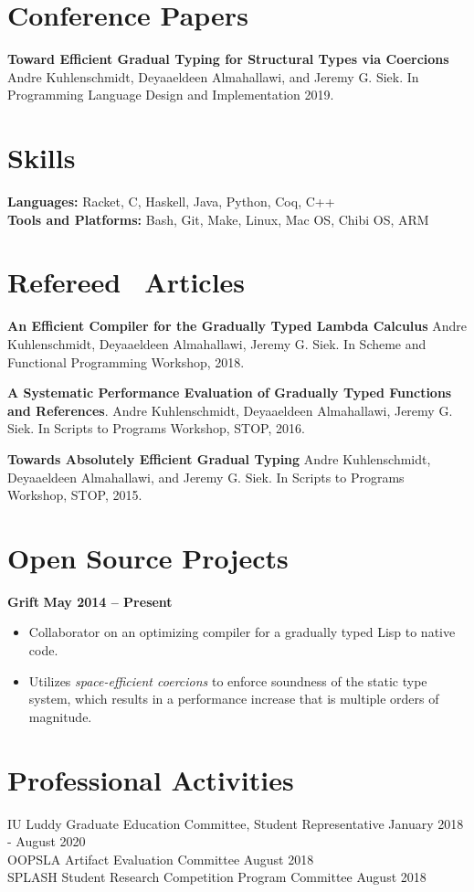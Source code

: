 \documentclass[resmargin,line]{res}
\begin{document}
\begin{resume}
\section{\sc Conference Papers}
{\bf Toward Efficient Gradual Typing for Structural Types via Coercions}
Andre Kuhlenschmidt, Deyaaeldeen Almahallawi, and Jeremy G. Siek.
In Programming Language Design and Implementation 2019.

\section{\sc Skills}
{\bf Languages:} Racket, C, Haskell, Java, Python, Coq, C++\\
{\bf Tools and Platforms:} Bash, Git, Make, Linux, Mac OS, Chibi OS, ARM

\section{\sc Refereed \, Articles}

{\bf An Efficient Compiler for the Gradually Typed Lambda Calculus}
Andre Kuhlenschmidt, Deyaaeldeen Almahallawi, Jeremy G. Siek.
In Scheme and Functional Programming Workshop, 2018.

{\bf A Systematic Performance Evaluation of Gradually Typed Functions
  and References}.
Andre Kuhlenschmidt, Deyaaeldeen Almahallawi, Jeremy G. Siek.
In Scripts to Programs Workshop, STOP, 2016.

{\bf Towards Absolutely Efficient Gradual Typing}
Andre Kuhlenschmidt, Deyaaeldeen Almahallawi, and Jeremy G. Siek.
In Scripts to Programs Workshop, STOP, 2015.
\pagebreak

\section{\sc Open Source Projects}

{\bf Grift}
\hfill {\bf May 2014 -- Present}\\
\vspace*{-.35cm}
\begin{itemize}
\item Collaborator on an optimizing compiler for a gradually typed
  Lisp to native code.
\item Utilizes {\em space-efficient coercions} to enforce soundness of
  the static type system, which results in a performance increase that
  is multiple orders of magnitude.
\end{itemize}


\section{\sc Professional Activities}

IU Luddy Graduate Education Committee, Student Representative
\hfill January 2018 - August 2020\\
OOPSLA Artifact Evaluation Committee \hfill August 2018\\
SPLASH Student Research Competition Program Committee \hfill August 2018

\end{resume}
\end{document}
